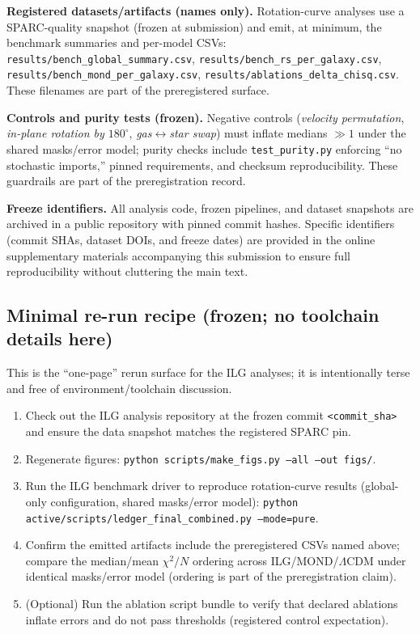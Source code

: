 \documentclass[11pt]{article}
\begin{document}
\noindent\textbf{Registered datasets/artifacts (names only).} Rotation-curve analyses use a SPARC-quality snapshot (frozen at submission) and emit, at minimum, the benchmark summaries and per-model CSVs: \texttt{results/bench\_global\_summary.csv}, \texttt{results/bench\_rs\_per\_galaxy.csv}, \texttt{results/bench\_mond\_per\_galaxy.csv}, \texttt{results/ablations\_delta\_chisq.csv}. These filenames are part of the preregistered surface. 

\medskip
\noindent\textbf{Controls and purity tests (frozen).} Negative controls (\textit{velocity permutation}, \textit{in-plane rotation by $180^\circ$}, \textit{gas$\leftrightarrow$star swap}) must inflate medians $\gg 1$ under the shared masks/error model; purity checks include \texttt{test\_purity.py} enforcing ``no stochastic imports,'' pinned requirements, and checksum reproducibility. These guardrails are part of the preregistration record. 

\medskip
\noindent\textbf{Freeze identifiers.}
All analysis code, frozen pipelines, and dataset snapshots are archived in a public repository with pinned commit hashes. Specific identifiers (commit SHAs, dataset DOIs, and freeze dates) are provided in the online supplementary materials accompanying this submission to ensure full reproducibility without cluttering the main text.

\subsection*{Minimal re-run recipe (frozen; no toolchain details here)}
This is the ``one-page'' rerun surface for the ILG analyses; it is intentionally terse and free of environment/toolchain discussion.

\begin{enumerate}
  \item Check out the ILG analysis repository at the frozen commit \texttt{<commit\_sha>} and ensure the data snapshot matches the registered SPARC pin.
  \item Regenerate figures: \texttt{python scripts/make\_figs.py --all --out figs/}. 
  \item Run the ILG benchmark driver to reproduce rotation-curve results (global-only configuration, shared masks/error model): \texttt{python active/scripts/ledger\_final\_combined.py --mode=pure}. 
  \item Confirm the emitted artifacts include the preregistered CSVs named above; compare the median/mean $\chi^2/N$ ordering across ILG/MOND/$\Lambda$CDM under identical masks/error model (ordering is part of the preregistration claim). 
  \item (Optional) Run the ablation script bundle to verify that declared ablations inflate errors and do not pass thresholds (registered control expectation). 
\end{enumerate}
\end{document}
